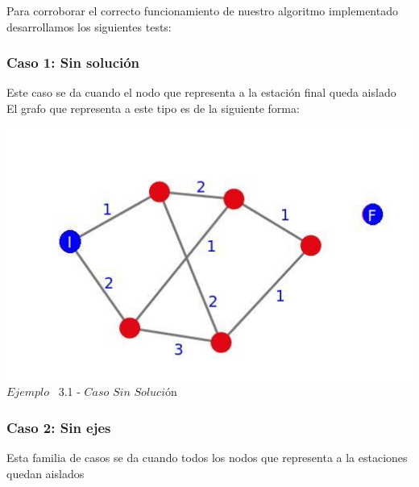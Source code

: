 \indent Para corroborar el correcto funcionamiento de nuestro algoritmo implementado desarrollamos los siguientes tests:\\


\begin{center}
 \subsubsection*{Caso 1: Sin solución}
\end{center}

Este caso se da cuando el nodo que representa a la estaci\'on final queda aislado  \\

El grafo que representa a este tipo es de la siguiente forma:\\

\vspace*{0.3cm} \vspace*{0.3cm}
  \begin{center}
 \includegraphics[scale=0.5]{./EJ3/grafoSinSolucion.jpeg}
 \\{$Ejemplo$ \ 3.1 - $Caso$ $Sin$ $Soluci$\'on}
  \end{center}
  \vspace*{0.3cm}
 
\begin{center}
 \subsubsection*{Caso 2: Sin ejes}
\end{center}

Esta familia de casos se da cuando todos los nodos que representa a la estaciones quedan aislados  \\

